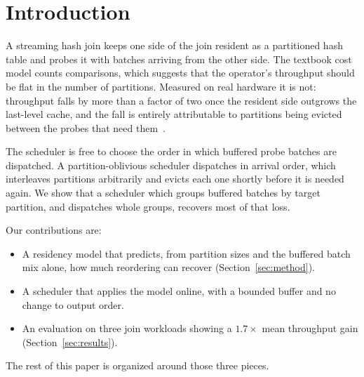 \section{Introduction}
\label{sec:intro}

A streaming hash join keeps one side of the join resident as a partitioned
hash table and probes it with batches arriving from the other side. The
textbook cost model counts comparisons, which suggests that the operator's
throughput should be flat in the number of partitions. Measured on real
hardware it is not: throughput falls by more than a factor of two once the
resident side outgrows the last-level cache, and the fall is entirely
attributable to partitions being evicted between the probes that need
them~\cite{balkesen2013}.

The scheduler is free to choose the order in which buffered probe batches
are dispatched. A partition-oblivious scheduler dispatches in arrival
order, which interleaves partitions arbitrarily and evicts each one
shortly before it is needed again. We show that a scheduler which groups
buffered batches by target partition, and dispatches whole groups,
recovers most of that loss.

Our contributions are:

\begin{itemize}
\item A residency model that predicts, from partition sizes and the
  buffered batch mix alone, how much reordering can recover
  (Section~\ref{sec:method}).
\item A scheduler that applies the model online, with a bounded buffer
  and no change to output order.
\item An evaluation on three join workloads showing a
  \(1.7\times\) mean throughput gain (Section~\ref{sec:results}).
\end{itemize}

The rest of this paper is organized around those three pieces.
